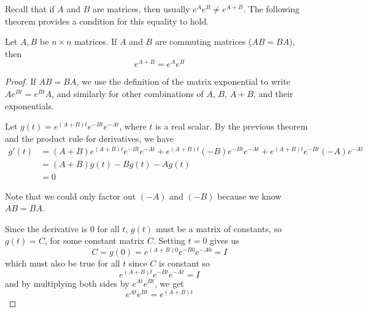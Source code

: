 Recall that if $A$ and $B$ are matrices, then usually $e^{A} e^{B} \neq e^{A + B}$. The following theorem provides a condition for this equality to hold. 

\begin{theorem}
Let $A, B$ be $n \times n$ matrices. If $A$ and $B$ are commuting matrices ($AB = BA$), then 
$$e^{A + B} = e^{A} e^{B}$$
\end{theorem}

\begin{proof}
If $AB = BA$, we use the definition of the matrix exponential to write $Ae^{Bt} = e^{Bt}A$, and similarly for other combinations of $A$, $B$, $A + B$, and their exponentials. 

Let $g(t) = e^{(A + B)t} e^{-Bt} e^{-At}$, where $t$ is a real scalar. By the previous theorem and the product rule for derivatives, we have 
$$
\begin{aligned}
g'(t) &= (A + B)e^{(A + B)t} e^{-Bt}e^{-At} + e^{(A + B)t} (-B) e^{-Bt} e^{-At} + e^{(A+B)t} e^{-Bt} (-A) e^{-At} \\
&= (A+B) g(t) - Bg(t) -Ag(t) \\
&= 0
\end{aligned}
$$

Note that we could only factor out $(-A)$ and $(-B)$ because we know $AB = BA$. 

Since the derivative is 0 for all $t$, $g(t)$ must be a matrix of constants, so $g(t) = C$, for some constant matrix $C$. Setting $t=0$ gives us 
$$C = g(0) = e^{(A+B)0} e^{-B0} e^{-A0} = I$$
which must also be true for all $t$ since $C$ is constant so 
$$e^{(A+B)t} e^{-Bt} e^{-At} = I$$
and by multiplying both sides by $e^{At} e^{Bt}$, we get 
$$e^{At} e^{Bt} = e^{(A+B)t}$$
\end{proof}